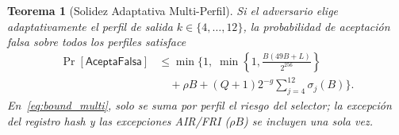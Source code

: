 \documentclass[conference]{IEEEtran}
\newtheorem{theorem}{Teorema}
\theoremstyle{definition}
\begin{document}
\begin{theorem}[Solidez Adaptativa Multi-Perfil]
\label{thm:multi}
Si el adversario elige adaptativamente el perfil de salida $k \in \{4, \dots, 12\}$, la probabilidad de aceptaci\'{o}n falsa sobre todos los perfiles satisface
\begin{equation}
\label{eq:bound_multi}
\begin{aligned}
\Pr[\mathsf{AceptaFalsa}] &\le \min\biggl\{1,\;
\min\left\{1, \frac{B(49B + L)}{2^{256}}\right\} \\
&\quad + \rho B + (Q + 1)2^{-g}\sum_{j=4}^{12} \sigma_j(B)\biggr\}.
\end{aligned}
\end{equation}
En~\eqref{eq:bound_multi}, solo se suma por perfil el riesgo del selector; la excepci\'{o}n del registro hash y las excepciones AIR/FRI ($\rho B$) se incluyen una sola vez.
\end{theorem}
\end{document}
